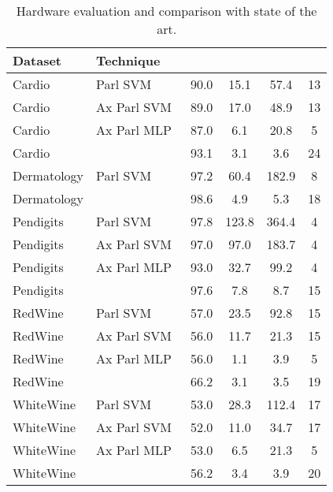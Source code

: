 \begin{table}[t!]
\setlength\tabcolsep{4pt} 
\caption{Hardware evaluation and comparison with state of the art.}
\label{tab:compsoa}
\footnotesize
\centering
\renewcommand{\arraystretch}{1}

\begin{tabular}{ll|S[table-format=2.1]|S[table-format=3.1]S[table-format=3.1]S[table-format=2]}

\hline
\textbf{Dataset} & \textbf{Technique} & {} & {} & {} & {}\\ \hline
Cardio & Parl SVM~\cite{Mubarik:MICRO:2020:printedml} & 90.0 & 15.1 & 57.4 & 13 \\
Cardio & Ax Parl SVM~\cite{Armeniakos:TCAD2023:cross} & 89.0 & 17.0 & 48.9 & 13 \\
Cardio & Ax Parl MLP~\cite{Armeniakos:TC2023:codesign} & 87.0 & 6.1 & 20.8 & 5 \\
Cardio &  & 93.1 & 3.1 & 3.6 & 24 \\
\hline
Dermatology & Parl SVM~\cite{Mubarik:MICRO:2020:printedml} & 97.2 & 60.4 & 182.9 & 8 \\
Dermatology &  & 98.6 & 4.9 & 5.3 & 18 \\
\hline
Pendigits & Parl SVM~\cite{Mubarik:MICRO:2020:printedml} & 97.8 & 123.8 & 364.4 & 4 \\
Pendigits & Ax Parl SVM~\cite{Armeniakos:TCAD2023:cross} & 97.0 & 97.0 & 183.7 & 4 \\
Pendigits & Ax Parl MLP~\cite{Armeniakos:TC2023:codesign} & 93.0 & 32.7 & 99.2 & 4 \\
Pendigits &  & 97.6 & 7.8 & 8.7 & 15 \\
\hline
RedWine & Parl SVM~\cite{Mubarik:MICRO:2020:printedml} & 57.0 & 23.5 & 92.8 & 15 \\
RedWine & Ax Parl SVM~\cite{Armeniakos:TCAD2023:cross} & 56.0 & 11.7 & 21.3 & 15 \\
RedWine & Ax Parl MLP~\cite{Armeniakos:TC2023:codesign} & 56.0 & 1.1 & 3.9 & 5 \\
RedWine &  & 66.2 & 3.1 & 3.5 & 19 \\
\hline
WhiteWine & Parl SVM~\cite{Mubarik:MICRO:2020:printedml} & 53.0 & 28.3 & 112.4 & 17 \\
WhiteWine & Ax Parl SVM~\cite{Armeniakos:TCAD2023:cross} & 52.0 & 11.0 & 34.7 & 17 \\
WhiteWine & Ax Parl MLP~\cite{Armeniakos:TC2023:codesign} & 53.0 & 6.5 & 21.3 & 5 \\
WhiteWine &  & 56.2 & 3.4 & 3.9 & 20 \\
\hline
\end{tabular}\vspace{-4ex}

\end{table}